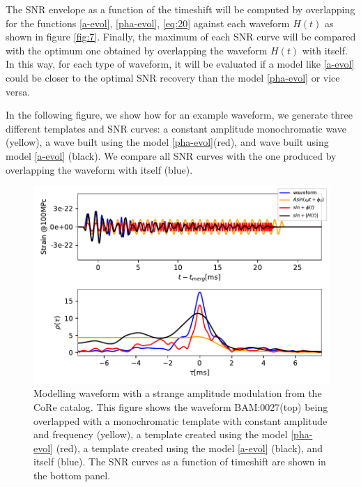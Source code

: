 The SNR envelope as a function of the timeshift will be computed by overlapping for the functions \ref{a-evol}, \ref{pha-evol}, \ref{eq:20} against each waveform $H(t)$ as shown in figure \ref{fig:7}. Finally, the maximum of each SNR curve will be compared with the optimum one obtained by overlapping the waveform $H(t)$ with itself. In this way, for each type of waveform, it will be evaluated if a model like \ref{a-evol} could be closer to the optimal SNR recovery than the model \ref{pha-evol} or vice versa.

In the following figure, we show how for an example waveform, we generate three different templates and SNR curves: a constant amplitude monochromatic wave (yellow), a wave built using the model \ref{pha-evol}(red), and wave built using model \ref{a-evol} (black). We compare all SNR curves with the one produced by overlapping the waveform with itself (blue).

\begin{figure}[hbt!]
\begin{center}
\includegraphics[width=\textwidth, angle=0]{images/Data_analysis/results/phi-A0.pdf}
\captionsetup{width=0.8\textwidth}
\caption[Modelling waveform with a strange amplitude modulation from the CoRe catalog]{Modelling waveform with a strange amplitude modulation from the CoRe catalog. This figure shows the waveform BAM:0027(top) \cite{Dietrich:2018phi} being overlapped with a monochromatic template with constant amplitude and frequency (yellow), a template created using the model \ref{pha-evol} (red), a template created using the model \ref{a-evol} (black), and itself (blue). The SNR curves as a function of timeshift are shown in the bottom panel.}
\label{analysis}
\end{center}
\end{figure}
\FloatBarrier



